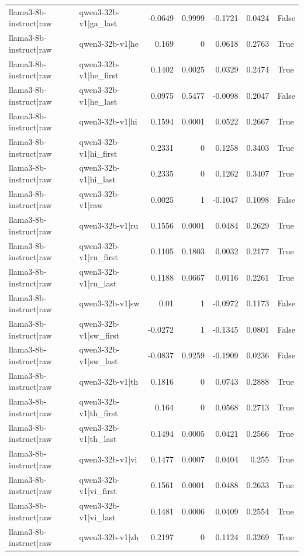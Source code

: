 \begin{table}
\begin{tabular}{l l r r r r l}
llama3-8b-instruct|raw & qwen3-32b-v1|ga_last & -0.0649 & 0.9999 & -0.1721 & 0.0424 & False \\
llama3-8b-instruct|raw & qwen3-32b-v1|he & 0.169 & 0 & 0.0618 & 0.2763 & True \\
llama3-8b-instruct|raw & qwen3-32b-v1|he_first & 0.1402 & 0.0025 & 0.0329 & 0.2474 & True \\
llama3-8b-instruct|raw & qwen3-32b-v1|he_last & 0.0975 & 0.5477 & -0.0098 & 0.2047 & False \\
llama3-8b-instruct|raw & qwen3-32b-v1|hi & 0.1594 & 0.0001 & 0.0522 & 0.2667 & True \\
llama3-8b-instruct|raw & qwen3-32b-v1|hi_first & 0.2331 & 0 & 0.1258 & 0.3403 & True \\
llama3-8b-instruct|raw & qwen3-32b-v1|hi_last & 0.2335 & 0 & 0.1262 & 0.3407 & True \\
llama3-8b-instruct|raw & qwen3-32b-v1|raw & 0.0025 & 1 & -0.1047 & 0.1098 & False \\
llama3-8b-instruct|raw & qwen3-32b-v1|ru & 0.1556 & 0.0001 & 0.0484 & 0.2629 & True \\
llama3-8b-instruct|raw & qwen3-32b-v1|ru_first & 0.1105 & 0.1803 & 0.0032 & 0.2177 & True \\
llama3-8b-instruct|raw & qwen3-32b-v1|ru_last & 0.1188 & 0.0667 & 0.0116 & 0.2261 & True \\
llama3-8b-instruct|raw & qwen3-32b-v1|sw & 0.01 & 1 & -0.0972 & 0.1173 & False \\
llama3-8b-instruct|raw & qwen3-32b-v1|sw_first & -0.0272 & 1 & -0.1345 & 0.0801 & False \\
llama3-8b-instruct|raw & qwen3-32b-v1|sw_last & -0.0837 & 0.9259 & -0.1909 & 0.0236 & False \\
llama3-8b-instruct|raw & qwen3-32b-v1|th & 0.1816 & 0 & 0.0743 & 0.2888 & True \\
llama3-8b-instruct|raw & qwen3-32b-v1|th_first & 0.164 & 0 & 0.0568 & 0.2713 & True \\
llama3-8b-instruct|raw & qwen3-32b-v1|th_last & 0.1494 & 0.0005 & 0.0421 & 0.2566 & True \\
llama3-8b-instruct|raw & qwen3-32b-v1|vi & 0.1477 & 0.0007 & 0.0404 & 0.255 & True \\
llama3-8b-instruct|raw & qwen3-32b-v1|vi_first & 0.1561 & 0.0001 & 0.0488 & 0.2633 & True \\
llama3-8b-instruct|raw & qwen3-32b-v1|vi_last & 0.1481 & 0.0006 & 0.0409 & 0.2554 & True \\
llama3-8b-instruct|raw & qwen3-32b-v1|zh & 0.2197 & 0 & 0.1124 & 0.3269 & True \\

\end{tabular}
\end{table}
